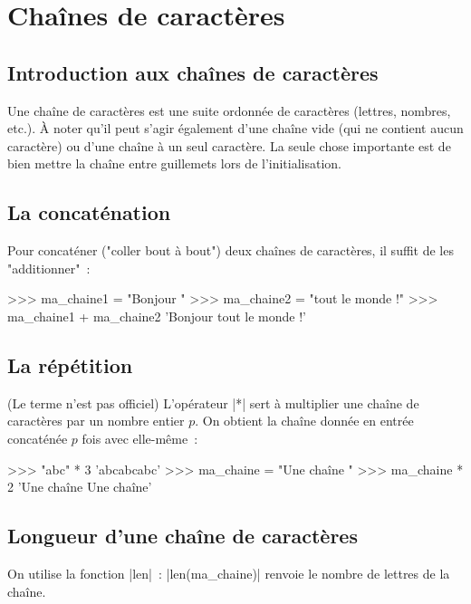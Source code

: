 \section{Chaînes de caractères} \label{str}

	\subsection{Introduction aux chaînes de caractères}
	
		Une chaîne de caractères est une suite ordonnée de caractères (lettres, nombres, etc.).
		À noter qu'il peut s'agir également d'une chaîne vide (qui ne contient aucun caractère) ou d'une chaîne à un seul caractère.
		La seule chose importante est de bien mettre la chaîne entre guillemets lors de l'initialisation.
		
	\subsection{La concaténation}
	
		Pour concaténer ("coller bout à bout") deux chaînes de caractères, il suffit de les "additionner"~:
		\begin{pythoncode}
			>>> ma_chaine1 = "Bonjour "
			>>> ma_chaine2 = "tout le monde !"
			>>> ma_chaine1 + ma_chaine2
			'Bonjour tout le monde !'
		\end{pythoncode}
	
	\subsection{La répétition}

		(Le terme n'est pas officiel) L'opérateur \python|*| sert à multiplier une chaîne de caractères par un nombre entier $p$. On obtient la chaîne donnée en entrée concaténée $p$ fois avec elle-même~:
		\begin{pythoncode}
			>>> "abc" * 3
			'abcabcabc'
			>>> ma_chaine = "Une chaîne "
			>>> ma_chaine * 2
			'Une chaîne Une chaîne'
		\end{pythoncode}
	
	\subsection{Longueur d'une chaîne de caractères} \label{len}
		
		On utilise la fonction \python|len|~: \python|len(ma_chaine)| renvoie le nombre de lettres de la chaîne.


